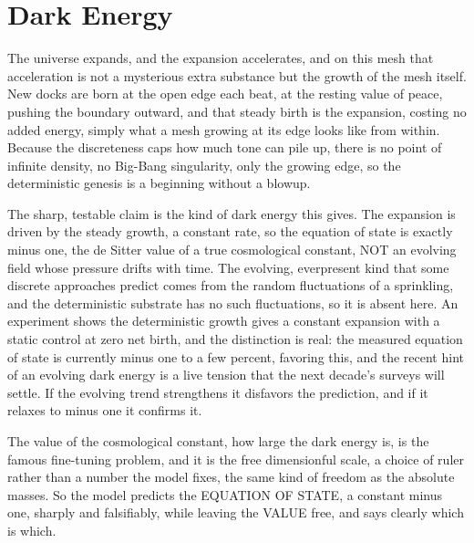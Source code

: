 \section{Dark Energy}

The universe expands, and the expansion accelerates, and on this mesh that acceleration is not a mysterious extra
substance but the growth of the mesh itself. New docks are born at the open edge each beat, at the resting value of
peace, pushing the boundary outward, and that steady birth is the expansion, costing no added energy, simply what a
mesh growing at its edge looks like from within. Because the discreteness caps how much tone can pile up, there is no
point of infinite density, no Big-Bang singularity, only the growing edge, so the deterministic genesis is a beginning
without a blowup.

The sharp, testable claim is the kind of dark energy this gives. The expansion is driven by the steady growth, a
constant rate, so the equation of state is exactly minus one, the de Sitter value of a true cosmological constant, NOT an
evolving field whose pressure drifts with time. The evolving, everpresent kind that some discrete approaches predict
comes from the random fluctuations of a sprinkling, and the deterministic substrate has no such fluctuations, so it is
absent here. An experiment shows the deterministic growth gives a constant expansion with a static control at zero net
birth, and the distinction is real: the measured equation of state is currently minus one to a few percent, favoring
this, and the recent hint of an evolving dark energy is a live tension that the next decade's surveys will settle. If the
evolving trend strengthens it disfavors the prediction, and if it relaxes to minus one it confirms it.

The value of the cosmological constant, how large the dark energy is, is the famous fine-tuning problem, and it is the
free dimensionful scale, a choice of ruler rather than a number the model fixes, the same kind of freedom as the absolute
masses. So the model predicts the EQUATION OF STATE, a constant minus one, sharply and falsifiably, while leaving the
VALUE free, and says clearly which is which.
